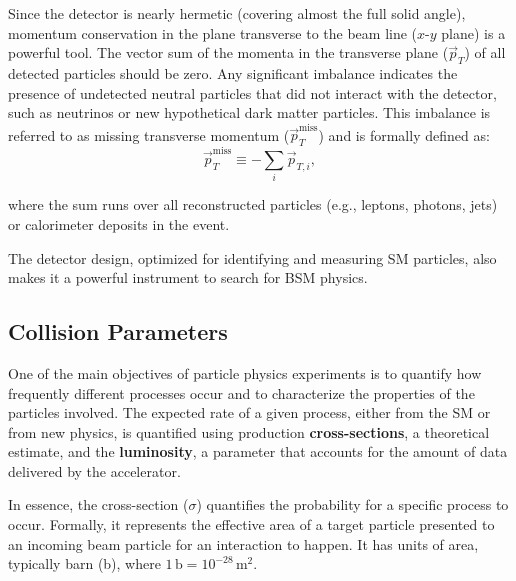 Since the detector is nearly hermetic (covering almost the full solid angle), momentum conservation in the plane transverse to the beam line ($x$-$y$ plane) is a powerful tool. The vector sum of the momenta in the transverse plane ($\vec{p}_T$) of all detected particles should be zero. Any significant imbalance indicates the presence of undetected  neutral particles that did not interact with the detector, such as neutrinos or new hypothetical dark matter particles. This imbalance is referred to as missing transverse momentum ($\vec{p}_T^{\text{miss}} $) and is formally defined as:
\begin{equation}
  \vec{p}_T^{\text{miss}} \equiv -\sum_i \vec{p}_{T,i},
  \label{eq:ptmiss}
\end{equation}


where the sum runs over all reconstructed particles (e.g., leptons, photons, jets) or calorimeter deposits in the event.

The detector design, optimized for identifying and measuring SM particles, also makes it a powerful instrument to search for BSM physics.

\subsection{Collision Parameters}\label{sec:cross_sec_lumi}

One of the main objectives of particle physics experiments is to quantify how frequently different processes occur and to characterize the properties of the particles involved. The expected rate of a given process, either from the SM or from new physics, is quantified using production \textbf{cross-sections}, a theoretical estimate, and the \textbf{luminosity}, a parameter that accounts for the amount of data delivered by the accelerator.


In essence, the  cross-section ($\sigma$) quantifies the probability for a specific process to occur. Formally, it represents the effective area of a target particle presented to an incoming beam particle for an interaction to happen. It has units of area, typically barn (b), where $1\,\text{b} = 10^{-28}\,\text{m}^2$.

